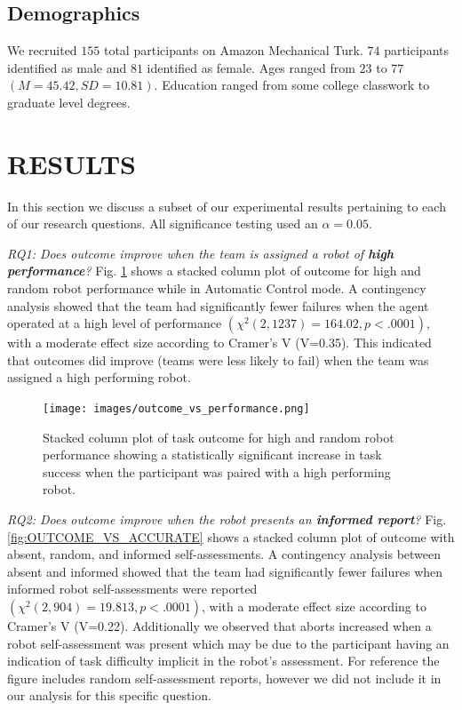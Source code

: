 \documentclass[aaai]{article}
\begin{document}
\subsection{Demographics}
We recruited $155$ total participants on Amazon Mechanical Turk. $74$ participants identified as male and $81$ identified as female. Ages ranged from $23$ to $77$ $(M=45.42, SD=10.81)$. Education ranged from some college classwork to graduate level degrees.

\section{RESULTS} \label{RESULTS}

In this section we discuss a subset of our experimental results pertaining to each of our research questions. All significance testing used an $\alpha = 0.05$.

\emph{RQ1: Does outcome improve when the team is assigned a robot of \textbf{high performance}?} Fig. \ref{fig:OUTCOME_VS_PERFORMANCE} shows a stacked column plot of outcome for high and random robot performance while in Automatic Control mode. A contingency analysis showed that the team had significantly fewer failures when the agent operated at a high level of performance $(\chi^2(2, 1237)=164.02, p<.0001)$, with a moderate effect size according to Cramer's V (V=0.35). This indicated that outcomes did improve (teams were less likely to fail) when the team was assigned a high performing robot.

\begin{figure}[htbp]
    \centering
    \texttt{[image: images/outcome\_vs\_performance.png]}
    \caption{Stacked column plot of task outcome for high and random robot performance showing a statistically significant increase in task success when the participant was paired with a high performing robot.}
    \label{fig:OUTCOME_VS_PERFORMANCE}
\end{figure}


\emph{RQ2: Does outcome improve when the robot presents an \textbf{informed report}?}  Fig. \ref{fig:OUTCOME_VS_ACCURATE} shows a stacked column plot of outcome with absent, random, and informed self-assessments. A contingency analysis between absent and informed showed that the team had significantly fewer failures when informed robot self-assessments were reported $(\chi^2(2, 904)= 19.813, p<.0001)$, with a moderate effect size according to Cramer's V (V=0.22). Additionally we observed that aborts increased when a robot self-assessment was present which may be due to the participant having an indication of task difficulty implicit in the robot's assessment. For reference the figure includes random self-assessment reports, however we did not include it in our analysis for this specific question.
\end{document}
